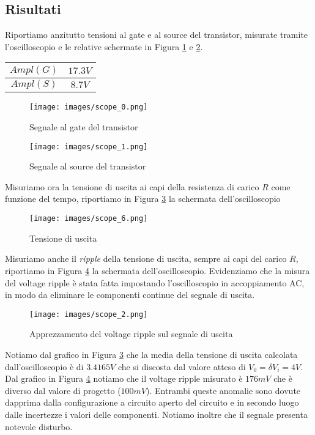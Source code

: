 \subsection{Risultati}
Riportiamo anzitutto tensioni al gate e al source del transistor, misurate tramite l'oscilloscopio e le relative schermate in Figura \ref{fig:GateMeasure1} e \ref{fig:SourceMeasure1}.
\begin{table}[H]
    \centering
    \begin{tabular}{|c|c|}
        \hline
        $Ampl(G)$&$17.3V$\\\hline
        $Ampl(S)$&$8.7V$\\\hline
    \end{tabular}
\end{table}
\begin{figure}[H]
    \centering
    \texttt{[image: images/scope\_0.png]}
    \caption{Segnale al gate del transistor}
    \label{fig:GateMeasure1}
\end{figure}
\begin{figure}[H]
    \centering
    \texttt{[image: images/scope\_1.png]}
    \caption{Segnale al source del transistor}
    \label{fig:SourceMeasure1}
\end{figure}
Misuriamo ora la tensione di uscita ai capi della resistenza di carico $R$ come funzione del tempo, riportiamo in Figura \ref{fig:OutputLoad1} la schermata dell'oscilloscopio
\begin{figure}[H]
    \centering
    \texttt{[image: images/scope\_6.png]}
    \caption{Tensione di uscita}
    \label{fig:OutputLoad1}
\end{figure}
Misuriamo anche il \textit{ripple} della tensione di uscita, sempre ai capi del carico $R$, riportiamo in Figura \ref{fig:OutputRipple1}  la schermata dell'oscilloscopio. Evidenziamo che la misura del voltage ripple è stata fatta impostando l'oscilloscopio in accoppiamento AC, in modo da eliminare le componenti continue del segnale di uscita.
\begin{figure}[H]
    \centering
    \texttt{[image: images/scope\_2.png]}
    \caption{Apprezzamento del voltage ripple sul segnale di uscita}
    \label{fig:OutputRipple1}
\end{figure}
Notiamo dal grafico in Figura \ref{fig:OutputLoad1} che la media della tensione di uscita calcolata dall'oscilloscopio è di $3.4165V$ che si discosta dal valore atteso di $V_0=\delta V_i=4V$. Dal grafico in Figura \ref{fig:OutputRipple1} notiamo che il voltage ripple misurato è $176mV$ che è diverso dal valore di progetto ($100mV$). Entrambi queste anomalie sono dovute dapprima dalla configurazione a circuito aperto del circuito e in secondo luogo dalle incertezze i valori delle componenti. Notiamo inoltre che il segnale presenta notevole disturbo.
\clearpage


